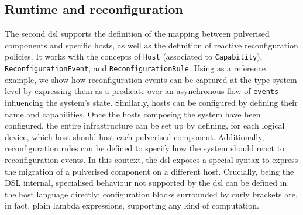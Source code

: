 \documentclass[conference]{IEEEtran}
\begin{document}
\subsection{Runtime and reconfiguration}

The second \ac{dsl} supports the definition of the mapping between pulverised components and specific hosts,
as well as the definition of reactive reconfiguration policies.
%
It works with the concepts of \texttt{Host}
(associated to \texttt{Capability}),
\texttt{ReconfigurationEvent},
and \texttt{ReconfigurationRule}.
%
Using  as a reference example,
we show how reconfiguration events can be captured at the type system level
by expressing them as a predicate over an asynchronous flow of \texttt{events} influencing the system's state.
%
Similarly, hosts can be configured by defining their name and capabilities.
%
Once the hosts composing the system have been configured,
the entire infrastructure can be set up by defining,
for each logical device,
which host should host each pulverised component.
%
Additionally,
reconfiguration rules can be defined to specify how the system should react to reconfiguration events.
%
In this context, the \ac{dsl} exposes a special syntax to express the migration of a pulverised component on a different host.
%
Crucially, being the DSL internal,
specialised behaviour not supported by the \ac{dsl} can be defined in the host language directly:
configuration blocks surrounded by curly brackets are,
in fact,
plain lambda expressions, supporting any kind of computation.



\end{document}
